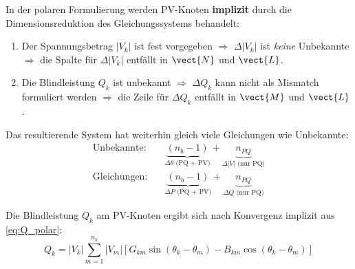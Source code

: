 In der polaren Formulierung werden PV-Knoten \textbf{implizit} durch die Dimensionsreduktion des Gleichungssystems behandelt:

\begin{enumerate}
	\item Der Spannungsbetrag $|V_k|$ ist fest vorgegeben $\Rightarrow$ $\Delta|V_k|$ ist \textit{keine} Unbekannte $\Rightarrow$ die Spalte für $\Delta|V_k|$ entfällt in $\vect{N}$ und $\vect{L}$.
	\item Die Blindleistung $Q_k$ ist unbekannt $\Rightarrow$ $\Delta Q_k$ kann nicht als Mismatch formuliert werden $\Rightarrow$ die Zeile für $\Delta Q_k$ entfällt in $\vect{M}$ und $\vect{L}$.
\end{enumerate}

Das resultierende System hat weiterhin gleich viele Gleichungen wie Unbekannte:
\begin{align}
	\text{Unbekannte:} &\quad \underbrace{(n_b - 1)}_{\Delta\theta \text{ (PQ + PV)}} + \underbrace{n_{PQ}}_{\Delta|V| \text{ (nur PQ)}} \nonumber\\
	\text{Gleichungen:} &\quad \underbrace{(n_b - 1)}_{\Delta P \text{ (PQ + PV)}} + \underbrace{n_{PQ}}_{\Delta Q \text{ (nur PQ)}} \nonumber
\end{align}

Die Blindleistung $Q_k$ am PV-Knoten ergibt sich nach Konvergenz implizit aus \eqref{eq:Q_polar}:
\begin{equation}
	Q_k = |V_k| \sum_{m=1}^{n_b} |V_m| \left[ G_{km}\sin(\theta_k - \theta_m) - B_{km}\cos(\theta_k - \theta_m) \right]
	\label{eq:Q_pv_nachher}
\end{equation}

